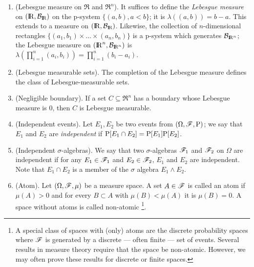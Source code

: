 \documentclass[a4paper,10pt]{scrbook}
\begin{document}
\begin{enumerate}
 \item (Lebesgue measure on $\Re$ and $\Re^n$). It suffices to define the \textit{Lebesgue measure} on $(\Re,\B_\Re)$
       on the p-system $\{(a,b), a<b\}$; it is $\lambda((a,b))=b - a$. This extends to a measure on  $(\Re,\B_\Re)$.
       Likewise, the collection of $n$-dimensional rectangles $\{(a_1, b_1)\times\ldots \times (a_n, b_n)\}$ is a p-system
       which generates $\B_{\Re^n}$; the Lebesgue measure on $(\Re^n, \B_{\Re^n})$ is 
       $\lambda(\prod_{i=1}^n (a_i, b_i))=\prod_{i=1}^n (b_i-a_i)$.
 
 \item (Lebesgue measurable sets). The completion of the Lebesgue measure defines the class of Lebesgue-measurable
       sets. 
             
 \item (Negligible boundary). If a set $C\subseteq \Re^n$ has a boundary whose Lebesgue measure is $0$, then 
       $C$ is Lebesgue measurable.
       
 \item (Independent events). Let $E_1,E_2$ be two events from $(\Omega,\mathscr{F},\mathrm{P})$; we say that $E_1$ and $E_2$ are \textit{independent}
       if $\mathrm{P}[E_1\cap E_2] = \mathrm{P}[E_1]\mathrm{P}[E_2]$.
       
 \item (Independent $\sigma$-algebras). We say that two $\sigma$-algebras $\mathscr{F}_1$ and $\mathscr{F}_2$ on $\Omega$ 
       are independent if for any $E_1\in \mathscr{F}_1$ and $E_2\in\mathscr{F}_2$, $E_1$ and $E_2$ are independent.
       Note that $E_1\cap E_2$ is a member of the $\sigma$ algebra $E_1 \wedge E_2$.
       
 \item (Atom). Let $(\Omega, \mathscr{F}, \mu)$ be a measure space. A set $A\in\mathscr{F}$ is called an atom if
       $\mu(A)>0$ and for every $B\subset A$ with $\mu(B)<\mu(A)$ it is $\mu(B)=0$.
       A space without atoms is called non-atomic%
	    \footnote{A special class of spaces with (only) atoms are the discrete probability spaces where
	              $\mathscr{F}$ is generated by a discrete --- often finite --- set of events. Several 
	              results in measure theory require that the space be non-atomic. However, we may
	              often prove these results for discrete or finite spaces.}.
\end{enumerate}
\end{document}
